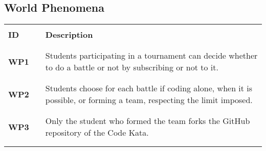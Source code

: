 \subsection{World Phenomena}
\renewcommand{\arraystretch}{0.5}
\begin{table}[H]
    \centering
    \begin{tabular}{l l p{12cm}}
        \hline
                     &        &                                                                                                                                                           \\
        \textbf{ID}  & \vline & \textbf{Description}                                                                                                                                      \\
                     &        &                                                                                                                                                           \\\hline & & \\
        \textbf{WP1} & \vline & Students participating in a tournament can decide whether to do a battle or not by subscribing or not to it.                                              \\
                     &        &                                                                                                                                                           \\\hline & & \\
        \textbf{WP2} & \vline & Students choose for each battle if coding alone, when it is possible, or forming a team, respecting the limit imposed.                                    \\
                     &        &                                                                                                                                                           \\\hline & & \\
        \textbf{WP3} & \vline & Only the student who formed the team forks the GitHub repository of the Code Kata.                                                                        \\
                     &        &                                                                                                                                                           \\\hline & & \\

\end{tabular}
\end{table}
